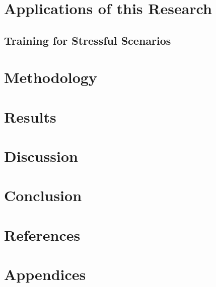 \documentclass[12pt]{article}
\begin{document}
\section{Applications of this Research}



\subsection{Training for Stressful Scenarios}

\section{Methodology}

\section{Results}

\section{Discussion}

\section{Conclusion}

\section{References}




\section{Appendices}
\end{document}
